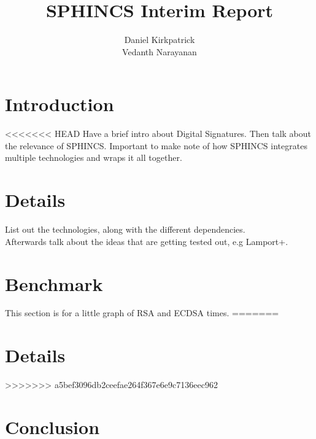 \documentclass[]{scrartcl}
\title{SPHINCS Interim Report}
\author{Daniel Kirkpatrick\\Vedanth Narayanan}
\begin{document}
\maketitle


\section*{Introduction}
<<<<<<< HEAD
Have a brief intro about Digital Signatures. Then talk about the relevance of SPHINCS. Important to make note of how SPHINCS integrates multiple technologies and wraps it all together.

\section*{Details}
List out the technologies, along with the different dependencies.\\
Afterwards talk about the ideas that are getting tested out, e.g Lamport+.

\section*{Benchmark}
This section is for a little graph of RSA and ECDSA times.
=======

\section*{Details}
>>>>>>> a5bef3096db2ceefae264f367e6e9c7136eec962

\section*{Conclusion}
\end{document}
